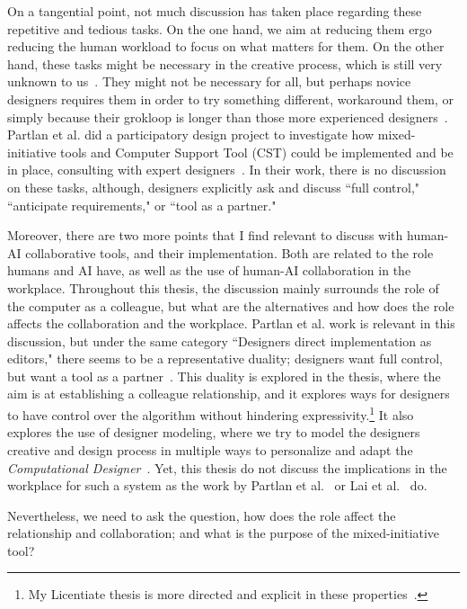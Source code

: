 On a tangential point, not much discussion has taken place regarding these repetitive and tedious tasks. On the one hand, we aim at reducing them ergo reducing the human workload to focus on what matters for them. On the other hand, these tasks might be necessary in the creative process, which is still very unknown to us~\cite{boden_creative_2004}. They might not be necessary for all, but perhaps novice designers requires them in order to try something different, workaround them, or simply because their grokloop is longer than those more experienced designers~\cite{compton_casual_2015}. Partlan et al. did a participatory design project to investigate how mixed-initiative tools and Computer Support Tool (CST) could be implemented and be in place, consulting with expert designers~\cite{partlan_design-driven_2021}. In their work, there is no discussion on these tasks, although, designers explicitly ask and discuss ``full control," ``anticipate requirements," or ``tool as a partner."

Moreover, there are two more points that I find relevant to discuss with human-AI collaborative tools, and their implementation. Both are related to the role humans and AI have, as well as the use of human-AI collaboration in the workplace. Throughout this thesis, the discussion mainly surrounds the role of the computer as a colleague, but what are the alternatives and how does the role affects the collaboration and the workplace. Partlan et al. work is relevant in this discussion, but under the same category ``Designers direct implementation as editors," there seems to be a representative duality; designers want full control, but want a tool as a partner~\cite{partlan_design-driven_2021}. This duality is explored in the thesis, where the aim is at establishing a colleague relationship, and it explores ways for designers to have control over the algorithm without hindering expressivity.\footnote{My Licentiate thesis is more directed and explicit in these properties~\cite{alvarez_exploring_2020}.} It also explores the use of designer modeling, where we try to model the designers creative and design process in multiple ways to personalize and adapt the \emph{Computational Designer}~\cite{liapis_designer_2013}. Yet, this thesis do not discuss the implications in the workplace for such a system as the work by Partlan et al.~\cite{partlan_design-driven_2021} or Lai et al.~\cite{lai_towards_2020,lai_mixed-initiative_2022} do. 

Nevertheless, we need to ask the question, how does the role affect the relationship and collaboration; and  what is the purpose of the mixed-initiative tool?

